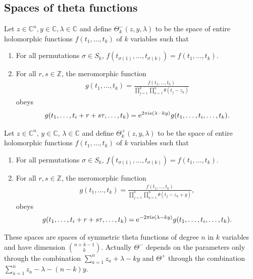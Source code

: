 \documentclass[pdftex]{sigma}
\numberwithin{equation}{section}
\begin{document}
\subsection{Spaces of theta functions}\label{ss-3.1}
\begin{Definition}\label{def-theta-} Let $z\in\mathbb C^n,y\in\mathbb C,\lambda\in\mathbb C$ and define $\Theta^-_k(z,y,\lambda)$ to be the space of entire holomorphic functions $f(t_1,\dots,t_k)$ of $k$ variables such that
 \begin{enumerate}\itemsep=0pt
 \item For all permutations $\sigma\in S_k$, $f(t_{\sigma(1)},\dots,t_{\sigma(k)})=f(t_1,\dots,t_k)$.
 \item For all $r,s\in\mathbb Z$, the meromorphic function
 \begin{gather*}
 g(t_1,\dots,t_k)=\frac{f(t_1,\dots,t_k)}{\prod\limits_{j=1}^k\prod\limits_{a=1}^n \theta(t_j-z_a)}
 \end{gather*}
 obeys
 \begin{gather*}
 g(t_1,\dots, t_i+r+s\tau,\dots,t_k)={\rm e}^{2\pi {\rm i}s(\lambda-ky)}g(t_1,\dots,t_i,\dots,t_k).
 \end{gather*}
 \end{enumerate}
\end{Definition}
\begin{Definition}\label{def-theta+} Let $z\in\mathbb C^n$, $y\in\mathbb C$, $\lambda\in\mathbb C$ and define $\Theta^+_k(z,y,\lambda)$ to be the space of entire holomorphic functions $f(t_1,\dots,t_k)$ of $k$ variables such that
 \begin{enumerate}\itemsep=0pt
 \item For all permutations $\sigma\in S_k$, $f(t_{\sigma(1)},\dots,t_{\sigma(k)})=f(t_1,\dots,t_k)$.
 \item For all $r,s\in\mathbb Z$, the meromorphic function
 \begin{gather*}
 g(t_1,\dots,t_k)=\frac{f(t_1,\dots,t_k)}{\prod\limits_{j=1}^k\prod\limits_{a=1}^n \theta(t_j-z_a+y)},
 \end{gather*}
 obeys
 \begin{gather*}
 g(t_1,\dots, t_i+r+s\tau,\dots,t_k)={\rm e}^{-2\pi{\rm i}s(\lambda-ky)}g(t_1,\dots,t_i,\dots,t_k).
 \end{gather*}
 \end{enumerate}
\end{Definition}
\begin{Remark}\label{remark-1} These spaces are spaces of symmetric theta functions of degree $n$ in $k$ variables and have dimension ${n+k-1 \choose k}$. Actually $\Theta^-$ depends on the parameters only through the combination $\sum\limits_{a=1}^n z_a+\lambda-ky$ and $\Theta^+$ through the combination $\sum\limits_{a=1}^nz_a-\lambda-(n-k)y$.
\end{Remark}
\end{document}
